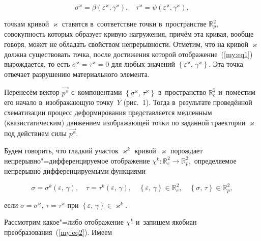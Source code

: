 \begin{equation}

\label{my:eq1}

\sigma^\varkappa=\beta(\varepsilon^\varkappa,\gamma^\varkappa),\quad \tau^\varkappa=\psi(\varepsilon^\varkappa,\gamma^\varkappa),

\end{equation}

точкам кривой $\varkappa$ ставятся в~соответствие точки в~пространстве $\mathbb R^2_{p},$ совокупность которых образует кривую нагружения, причём эта кривая, вообще говоря, может не обладать свойством непрерывности. Отметим, что на кривой $\varkappa$ должна существовать точка, после достижения которой отображение~(\ref{my:eq1}) вырождается, то есть $\sigma^\varkappa=\tau^\varkappa=0$ для любых значений $\left\{\varepsilon^\varkappa,\, \gamma^\varkappa\right\}.$ Эта точка отвечает разрушению материального элемента.



Перенесём вектор $\overrightarrow{p^\varkappa}$ с~компонентами $\left\{\sigma^\varkappa,\,\tau^\varkappa\right\}$ в~пространство $\mathbb R^2_{e}$ и~поместим его начало в~изображающую точку~$Y$ (рис.~1). Тогда в~результате проведённой схематизации процесс деформирования представляется медленным (квазистатическим) движением изображающей точки по заданной траектории $\varkappa$ под действием силы $\overrightarrow{p^\varkappa}.$



 Будем говорить, что гладкий участок $\varkappa^k$ кривой~$\varkappa$ порождает непрерывно"=дифференцируемое отображение $\chi^k\!:\mathbb R^2_{e}\rightarrow \mathbb R^2_{p},$ определяемое непрерывно дифференцируемыми функциями

\begin{equation}

\label{my:eq2}

\sigma=\sigma^k(\varepsilon,\,\gamma),\quad  \tau=\tau^k(\varepsilon,\,\gamma),\quad \left\{\varepsilon,\, \gamma\right\}\in \mathbb R^2_{e},\quad  \left\{\sigma,\, \tau\right\}\in \mathbb R^2_{p},

\end{equation}

если $\sigma=\sigma^\varkappa$, $\tau=\tau^\varkappa$ при $\left\{\varepsilon,\,\gamma\right\}\in \varkappa^k.$



Рассмотрим какое"=либо отображение $\chi^k$ и~запишем якобиан преобразования~(\ref{my:eq2}). Имеем

